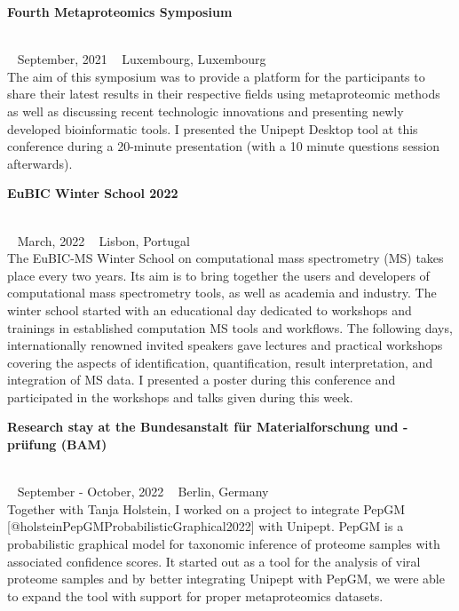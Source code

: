 \begin{large}\textbf{\textsf{Fourth Metaproteomics Symposium}}\end{large} \\
\faCalendar ~ \textsf{September, 2021} \hfill \faGlobe ~ \textsf{Luxembourg, Luxembourg} \\
The aim of this symposium was to provide a platform for the participants to share their latest results in their respective fields using metaproteomic methods as well as discussing recent technologic innovations and presenting newly developed bioinformatic tools.
I presented the Unipept Desktop tool at this conference during a 20-minute presentation (with a 10 minute questions session afterwards).

\pagebreak

\begin{large}\textbf{\textsf{EuBIC Winter School 2022}}\end{large} \\
\faCalendar ~ \textsf{March, 2022} \hfill \faGlobe ~ \textsf{Lisbon, Portugal} \\
The EuBIC-MS Winter School on computational mass spectrometry (MS) takes place every two years.
Its aim is to bring together the users and developers of computational mass spectrometry tools, as well as academia and industry.
The winter school started with an educational day dedicated to workshops and trainings in established computation MS tools and workflows.
The following days, internationally renowned invited speakers gave lectures and practical workshops covering the aspects of identification, quantification, result interpretation, and integration of MS data.
I presented a poster during this conference and participated in the workshops and talks given during this week.

\begin{large}\textbf{\textsf{Research stay at the Bundesanstalt für Materialforschung und -prüfung (BAM)}}\end{large} \\
\faCalendar ~ \textsf{September - October, 2022} \hfill \faGlobe ~ \textsf{Berlin, Germany} \\
Together with Tanja Holstein, I worked on a project to integrate PepGM [@holsteinPepGMProbabilisticGraphical2022] with Unipept.
PepGM is a probabilistic graphical model for taxonomic inference of proteome samples with associated confidence scores.
It started out as a tool for the analysis of viral proteome samples and by better integrating Unipept with PepGM, we were able to expand the tool with support for proper metaproteomics datasets.

